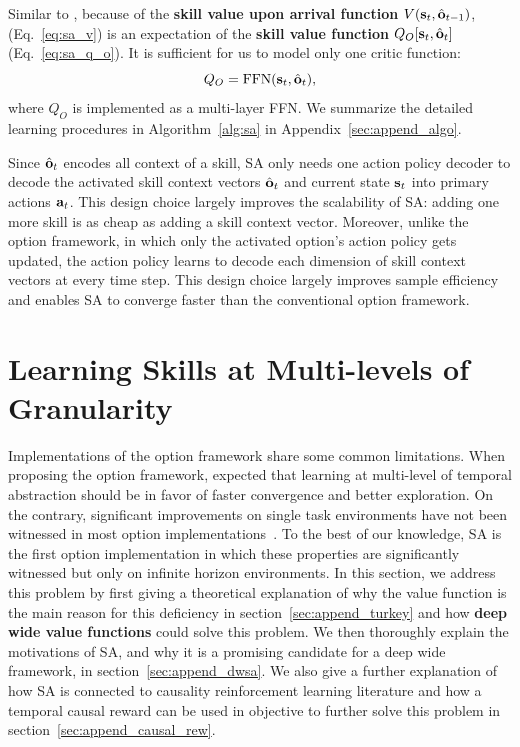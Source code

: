 Similar to , because of the \textbf{skill
  value upon arrival function} $V({\mathbf{s}}_t,\hat{{\mathbf{o}}}_{t-1})$,
(Eq.~\ref{eq:sa_v}) is an expectation of the \textbf{skill value
  function} $Q_O[{\mathbf{s}}_{t},\hat{{\mathbf{o}}}_{t}]$ (Eq.~\ref{eq:sa_q_o}).
It is sufficient for us to model only one critic function:
\begin{equation}
  \label{eq:nn_o_input}
  Q_O=\text{FFN}({\mathbf{s}}_t,\hat{{\mathbf{o}}}_t),
\end{equation}
where $Q_O$ is implemented as a multi-layer FFN. We summarize the
detailed learning procedures in Algorithm~\ref{alg:sa} in
Appendix~\ref{sec:append_algo}.

Since $\hat{{\mathbf{o}}}_t$ encodes all context of a skill, SA only
needs one action policy decoder to decode the activated skill
context vectors $\hat{{\mathbf{o}}}_t$ and current state ${\mathbf{s}}_t$ into
primary actions ${\mathbf{a}}_t$. This design choice largely improves the
scalability of SA: adding one more skill is as cheap as adding a
skill context vector. Moreover, unlike the option framework, in
which only the activated option's action policy gets updated, the
action policy learns to decode each dimension of skill context
vectors at every time step. This design choice largely improves
sample efficiency and enables SA to converge faster than the
conventional option framework.

\section{Learning Skills at Multi-levels of Granularity}
\label{sec:append_gist}

Implementations of the option framework share some common
limitations. When proposing the option framework,
 expected that learning at
multi-level of temporal abstraction should be in favor of faster
convergence and better exploration. On the contrary, significant
improvements on single task environments have not been witnessed
in most option
implementations~\cite{klissarov2017learnings,smith2018inference,harb2018waiting,zhang2019dac}.
To the best of our knowledge, SA is the first option
implementation in which these properties are significantly
witnessed but only on infinite horizon environments. In this
section, we address this problem by first giving a theoretical
explanation of why the value function is the main reason for this
deficiency in section~\ref{sec:append_turkey} and how
\textbf{deep wide value functions} could solve this problem. We
then thoroughly explain the motivations of SA, and why it is a
promising candidate for a deep wide framework, in
section~\ref{sec:append_dwsa}. We also give a further explanation
of how SA is connected to causality reinforcement learning
literature and how a temporal causal reward can be used in
objective to further solve this problem in
section~\ref{sec:append_causal_rew}.

